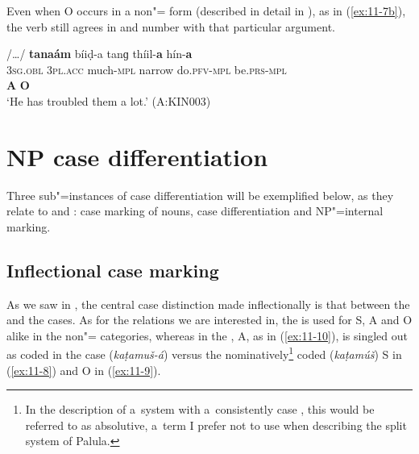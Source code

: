 Even when O occurs in a non"= form (described in detail in ), as in (\ref{ex:11-7b}), the verb still agrees in  and number with that particular   argument.

\begin{exe}
\ex
\label{ex:11-7b}
\glll [tíi] /{\ldots}/ \textbf{tanaám} bíiḍ-a tanɡ thíil-\textbf{a} hín-\textbf{a} \\
\textsc{3sg.obl} {} \textsc{3pl.acc} much-\textsc{mpl} narrow do.\textsc{pfv}-\textsc{mpl} be.\textsc{prs}-\textsc{mpl} \\
\textbf{A} {} \textbf{O} \\
\glt `He has troubled them a lot.' (A:KIN003)
\end{exe}


\section{NP case differentiation}
\label{sec:11-2}

Three sub"=instances of case differentiation will be exemplified below, as they relate to  and :  case marking of nouns,  case differentiation and NP"=internal marking.


\subsection{Inflectional case marking}
\label{subsec:11-2-1}


As we saw in , the central case distinction made inflectionally is that between the  and the  cases. As for the relations we are interested in, the  is used for S, A and O alike in the non"= categories, whereas in the , A, as in (\ref{ex:11-10}), is singled out as coded in the  case (\textit{kaṭamuš-á}) versus the nominatively\footnote{In the description of a~system with a~consistently  case , this would be referred to as absolutive, a~term I prefer not to use when describing the split  system of Palula.} coded (\textit{kaṭamúš}) S in (\ref{ex:11-8}) and O in (\ref{ex:11-9}).

